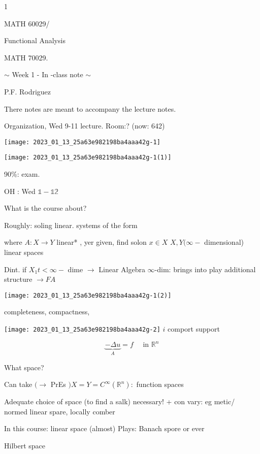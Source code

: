 \documentclass[10pt]{article}
\begin{document}
1

MATH 60029/

Functional Analysis

MATH 70029.

$\sim$ Week 1 - In -class note $\sim$

P.F. Rodriguez

There notes are meant to accompany the lecture notes.

Organization, Wed 9-11 lecture. Room:? (now: 642)

\begin{center}
\texttt{[image: 2023\_01\_13\_25a63e982198ba4aaa42g-1]}
\end{center}

\begin{center}
\texttt{[image: 2023\_01\_13\_25a63e982198ba4aaa42g-1(1)]}
\end{center}

90\%: exam.

$\mathrm{OH}$ : Wed $\mathbb{1 - 1 2}$

What is the course about?

Roughly: soling linear. systems of the form

where $A: X \rightarrow Y$ linear* , yer given, find solon $x \in X$ $X, Y(\infty-$ dimensional) linear spaces

Dint. if $X_{1} t<\infty-$ dime $\rightarrow$ Linear Algebra $\infty$-dim: brings into play additional structure $\rightarrow F A$

\begin{center}
\texttt{[image: 2023\_01\_13\_25a63e982198ba4aaa42g-1(2)]}
\end{center}

completeness, compactness,

\texttt{[image: 2023\_01\_13\_25a63e982198ba4aaa42g-2]}
$i$ comport support

$$
\underbrace{-\Delta u}_{A}=f \quad \text { in } \mathbb{R}^{n}
$$

What space?

Can take $(\rightarrow$ PrEs $) X=Y=C^{\infty}\left(\mathbb{R}^{n}\right):$ function spaces

Adequate choice of space (to find a salk) necessary! + con vary: eg metic/ normed linear spare, locally comber

In this course: linear space (almost) Plays: Banach spore or ever

Hilbert space
\end{document}
